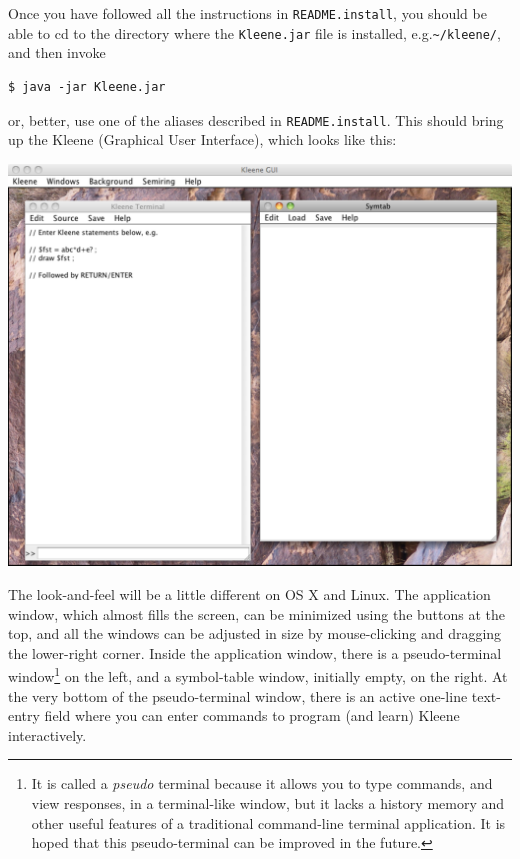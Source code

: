 Once you have followed all the instructions in \texttt{README.install},
you should be able to cd to the directory where the \texttt{Kleene.jar}
file is installed, e.g.\@ \texttt{\~{}/kleene/}, and then invoke 

\begin{Verbatim}
$ java -jar Kleene.jar
\end{Verbatim}

\noindent
or, better, use one of the aliases described in \texttt{README.install}.
This should bring up the Kleene  (Graphical User Interface),
which looks like this:


\begin{center}
\includegraphics[width=135mm]{images/KleeneGUI.pdf}
\end{center}


The look-and-feel will be a little different on OS X and Linux.  The
application window, which almost fills the screen, can be minimized using
the buttons at the top, and all the windows can be adjusted in size by
mouse-clicking and dragging  the lower-right corner.
Inside the application window, there is a
pseudo-terminal window\footnote{It is called a \emph{pseudo} terminal
because it allows you to type commands, and view responses, in a
terminal-like window, but it lacks a history memory and other useful
features of a traditional command-line terminal application.  It is hoped
that this pseudo-terminal can be improved in the future.}  on the left,
and a symbol-table window, initially empty, on the right.  At the very
bottom of the pseudo-terminal window, there is an active one-line
text-entry
field where you can enter commands to program (and learn) Kleene
interactively.  


